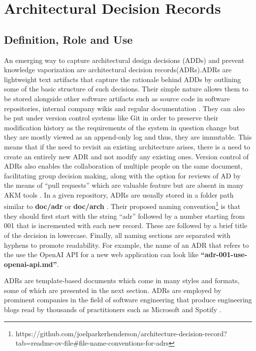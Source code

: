 \chapter{Architectural Decision Records}
    \section{Definition, Role and Use}
        An emerging way to capture architectural design decisions (ADDs) and prevent knowledge vaporization are architectural decision records(ADRs).\allowbreak ADRs are lightweight text artifacts that capture the rationale behind ADDs by outlining some of the basic structure of such decisions\cite{MarkdownADRs}. Their simple nature allows them to be stored alongside other software artifacts such as source code in software repositories, internal company wikis and regular documentation \cite{DOCUMENTING_ARCHITECTURE_DECISIONS}. They can also be put under version control systems like Git in order to preserve their modification history as the requirements of the system in question change but they are mostly viewed as an append-only log \cite{microsoftArchitectureDecision} and thus, they are immutable. This means that if the need to revisit an existing architecture arises, there is a need to create an entirely new ADR and not modify any existing ones. Version control of ADRs also enables the collaboration of multiple people on the same document, facilitating group decision making, along with the option for reviews of AD by the means of ``pull requests'' which are valuable feature but are absent in many AKM tools \cite{compare_study_adr_tools}. In a given repository, ADRs are usually stored in a folder path similar to \textbf{doc/adr} or \textbf{doc/arch} \cite{github_page_adrs}. Their proposed naming convention\footnote{https://github.com/joelparkerhenderson/architecture-decision-record?tab=readme-ov-file\#file-name-conventions-for-adrs} is that they should first start with the string ``adr'' followed by a number starting from 001 that is incremented with each new record. These are followed by a brief title of the decision in lowercase. Finally, all naming sections are separated with hyphens to promote readability. For example, the name of an ADR that refers to the use the OpenAI API for a new web application can look like \textbf{``adr-001-use-openai-api.md''}.
        
        ADRs are template-based documents which come in many styles and formats, some of which are presented in the next section. ADRs are employed by prominent companies in the field of software engineering that produce engineering blogs read by thousands of practitioners such as Microsoft and Spotify \cite{Spotify_ADRS, microsoftArchitectureDecision}. 
        
